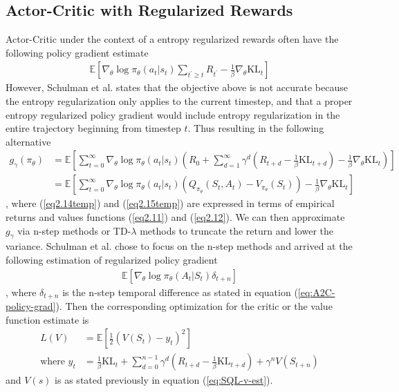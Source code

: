 \documentclass[12pt]{report}
\begin{document}
\subsection{Actor-Critic with Regularized Rewards} \label{sec:ac_reg}

Actor-Critic under the context of a entropy regularized rewards often \cite{williams1992simple} have the following policy gradient estimate
\begin{align}
    \mathbb{E}\left[\nabla_\theta \log \pi_\theta(a_t|s_t)\sum_{t^\prime \ge t} R_{t^\prime} - \frac{1}{\beta}\nabla_\theta \text{KL}_t\right]
\end{align}
However, Schulman et al. \cite{schulman2017equivalence} states that the objective above is not accurate because the entropy regularization only applies to the current timestep, and that a proper entropy regularized policy gradient would include entropy regularization in the entire trajectory beginning from timestep $t$. Thus resulting in the following alternative
\begin{align}
    g_\gamma(\pi_\theta)&=\mathbb{E}\left[\sum_{t=0}^\infty\nabla_\theta \log \pi_\theta(a_t|s_t)\left(R_0 + \sum_{d=1}^\infty \gamma^d \left(R_{t+d}-\frac{1}{\beta}\text{KL}_{t+d}\right)-\frac{1}{\beta}\nabla_\theta \text{KL}_{t} \right)\right] \label{eq2.14temp}\\
    &=\mathbb{E}\left[\sum_{t=0}^\infty\nabla_\theta \log \pi_\theta(a_t|s_t)(Q_{\pi_\theta}(S_t,A_t)-V_{\pi_\theta}(S_t))-\frac{1}{\beta}\nabla_\theta \text{KL}_t\right] \label{eq2.15temp}
\end{align}
, where (\ref{eq2.14temp}) and (\ref{eq2.15temp}) are expressed in terms of empirical returns and values functions (\ref{eq2.11}) and (\ref{eq2.12}). We can then approximate $g_\gamma$ via n-step methods \cite{mnih2016asynchronous} or TD-$\lambda$ methods \cite{schulman2015high} to truncate the return and lower the variance. Schulman et al. \cite{schulman2017equivalence} chose to focus on the n-step methods and arrived at the following estimation of regularized policy gradient
\begin{align}
    \mathbb{E}\left[\nabla_\theta \log \pi_\theta(A_t|S_t)\delta_{t+n}\right]
\end{align}
, where $\delta_{t+n}$ is the n-step temporal difference as stated in equation (\ref{eq:A2C-policy-grad}). Then the corresponding optimization for the critic or the value function estimate is
\begin{align}
    L(V) &= \mathbb{E}\left[\frac{1}{2}(V(S_t)-y_t)^2\right]\\
    \text{where } y_t &=\frac{1}{\beta}\text{KL}_t + \sum_{d=0}^{n-1} \gamma^d\left(R_{t+d}-\frac{1}{\beta}\text{KL}_{t+d}\right) + \gamma^n V(S_{t+n})
\end{align}
and $V(s)$ is as stated previously in equation (\ref{eq:SQL-v-est}).
\end{document}
